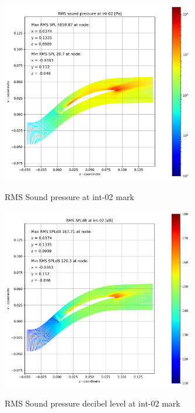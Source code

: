 \begin{figure}[ht]
  \centering
  \includegraphics[width=0.75\textwidth]{Figures/int-02-rms-spl.png} \label{int-02-rms-spl}
  \caption{RMS Sound pressure at int-02 mark}
  
  \vspace*{\floatsep}%

  \includegraphics[width=0.75\textwidth]{Figures/int-02-rms-spldb.png} \label{int-02-rms-spldb}
  \caption{RMS Sound pressure decibel level at int-02 mark}
\end{figure}
